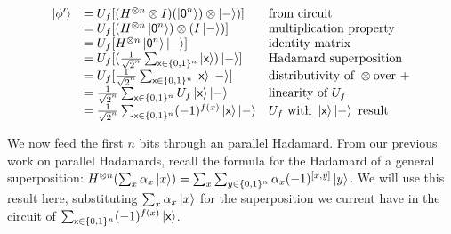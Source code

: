\[ 
\begin{array}{lll}
 \left|\phi'\right\rangle &= U_f [(H^{\otimes n} \otimes I)(\left|\textsf{0}^n\right\rangle) \otimes \left|-\right\rangle)]  & \text{from circuit} \\
  &= U_f [(H^{\otimes n}\left|\textsf{0}^n\right\rangle) \otimes (I\left|-\right\rangle)]  & \text{multiplication property} \\
  &= U_f [H^{\otimes n}\left|\textsf{0}^n\right\rangle\left|-\right\rangle]  & \text{identity matrix} \\
  &= U_f [(\frac{1}{\sqrt{2}^n} \sum_{\textsf{x} \in \{0,1\}^n} \left|\textsf{x}\right\rangle) \left|-\right\rangle] & \text{Hadamard superposition} \\
  &= U_f [\frac{1}{\sqrt{2}^n} \sum_{\textsf{x} \in \{0,1\}^n} \left|\textsf{x}\right\rangle \left|-\right\rangle]  
  & \text{distributivity of } \otimes  \text{over } + \\  
  &= \frac{1}{\sqrt{2}^n} \sum_{\textsf{x} \in \{0,1\}^n} U_f \left|\textsf{x}\right\rangle \left|-\right\rangle  & \text{linearity of } U_f \\
  &= \frac{1}{\sqrt{2}^n} \sum_{\textsf{x} \in \{0,1\}^n} (-1)^{f(x)} \left|\textsf{x}\right\rangle \left|-\right\rangle  
  & U_f \text{ with } \left|\textsf{x}\right\rangle\left|-\right\rangle \text{ result} 
\end{array}
\] 

We now feed the first $n$ bits through an parallel Hadamard.
From our previous work on parallel Hadamards, recall the formula for 
the Hadamard of a general superposition: $H^{\otimes n} (\sum_x \alpha_x \left|x\right\rangle) 
= \sum_x \sum_{y \in \{0,1\}^n} \alpha_x (-1)^{[x,y]} \left|y\right\rangle$. We will use this 
result here, substituting $\sum_x \alpha_x \left|x\right\rangle$ for the superposition we 
current have in the circuit of  $\sum_{\textsf{x} \in \{0,1\}^n} (-1)^{f(x)} \left|\textsf{x}\right\rangle$. 


